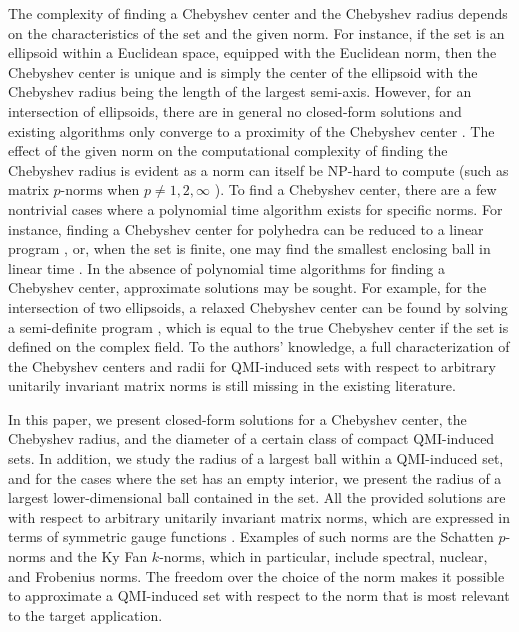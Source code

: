\documentclass[pdflatex,sn-mathphys-num]{sn-jnl}%
\theoremstyle{thmstyleone}
\begin{document}
The complexity of finding a Chebyshev center and the Chebyshev radius depends on the characteristics of the set and the given norm. For instance, if the set is an ellipsoid within a Euclidean space, equipped with the Euclidean norm, then the Chebyshev center is unique and is simply the center of the ellipsoid with the Chebyshev radius being the length of the largest semi-axis. However, for an intersection of ellipsoids, there are in general no closed-form solutions and existing algorithms only converge to a proximity of the Chebyshev center \cite{beck2007regularization,eldar2008minimax}.  The effect of the given norm on the computational complexity of finding the Chebyshev radius is evident as a norm can itself be NP-hard to compute (such as matrix $p$-norms when $p\neq 1,2,\infty$ \cite{hendrickx2010matrix}). To find a Chebyshev center, there are a few nontrivial cases where a polynomial time algorithm exists for specific norms. For instance, finding a Chebyshev center for polyhedra can be reduced to a linear program \cite{alimov2021geometric}, or, when the set is finite, one may find the smallest enclosing ball in linear time \cite{welzl2005smallest}.  In the absence of polynomial time algorithms for finding a Chebyshev center, approximate solutions may be sought. For example, for the intersection of two ellipsoids, a relaxed Chebyshev center can be found by solving a semi-definite program \cite{beck2007regularization}, which is equal to the true Chebyshev center if the set is defined on the complex field. To the authors' knowledge, a full characterization of the Chebyshev centers and radii for QMI-induced sets with respect to arbitrary unitarily invariant matrix norms is still missing in the existing literature. 


In this paper, we present closed-form solutions for a Chebyshev center, the Chebyshev radius, and the diameter of a certain class of compact QMI-induced sets. In addition, we study the radius of a largest ball within a QMI-induced set, and for the cases where the set has an empty interior, we present the radius of a largest lower-dimensional ball contained in the set. All the provided solutions are with respect to arbitrary unitarily invariant matrix norms, which are expressed in terms of symmetric gauge functions \cite{marshall2011inequalities}. Examples of such norms are the Schatten $p$-norms and the Ky Fan $k$-norms, which in particular, include spectral, nuclear, and Frobenius norms. The freedom over the choice of the norm makes it possible to approximate a QMI-induced set with respect to the norm that is most relevant to the target application. 
\end{document}
